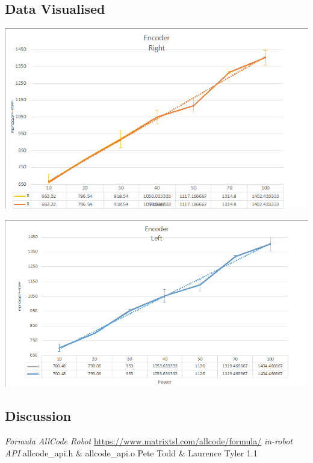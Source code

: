 \documentclass[11pt,a4paper,titlepage]{article}
\begin{document}
\subsection{Data Visualised}
\includegraphics{EncodersRight}

\includegraphics{EncodersLeft}
\subsection{Discussion}

\clearpage
{}
\begin{thebibliography}{5}
 \emph{Formula AllCode Robot}
\url{https://www.matrixtsl.com/allcode/formula/}
 \emph{in-robot API}
allcode\_api.h \& allcode\_api.o
Pete Todd \& Laurence Tyler 1.1
\end{thebibliography}
\clearpage

\label{thelastpage}
\end{document}
